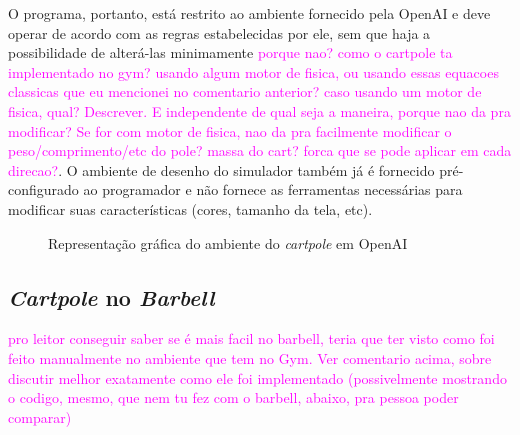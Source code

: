\documentclass[cic,tc]{iiufrgs}
\newcommand\bruno[1]{\textcolor{magenta}{#1}}
\begin{document}
\par O programa, portanto, está restrito ao ambiente fornecido pela OpenAI e deve operar de acordo com as regras estabelecidas
por ele, sem que haja a possibilidade de alterá-las minimamente \bruno{porque nao? como o cartpole ta implementado no gym? usando algum motor de fisica, ou usando essas equacoes classicas que eu mencionei no comentario anterior? caso usando um motor de fisica, qual? Descrever. E independente de qual seja a maneira, porque nao da pra modificar? Se for com motor de fisica, nao da pra facilmente modificar o peso/comprimento/etc do pole? massa do cart? forca que se pode aplicar em cada direcao?}. O ambiente de desenho do simulador também já é fornecido
pré-configurado ao programador e não fornece as ferramentas necessárias para modificar suas características (cores, tamanho
da tela, etc).

\begin{figure}[h!]
  \begin{center}
  \caption{Representação gráfica do ambiente do \textit{cartpole} em OpenAI}
  \label{fig:cartpole_openai}
\end{center}
\end{figure}

\subsection{\textit{Cartpole} no \textit{Barbell}}
\bruno{pro leitor conseguir saber se é mais facil no barbell, teria que ter visto como foi feito manualmente no ambiente que tem no Gym. Ver comentario acima, sobre discutir melhor exatamente como ele foi implementado (possivelmente mostrando o codigo, mesmo, que nem tu fez com o barbell, abaixo, pra pessoa poder comparar)}
\end{document}
